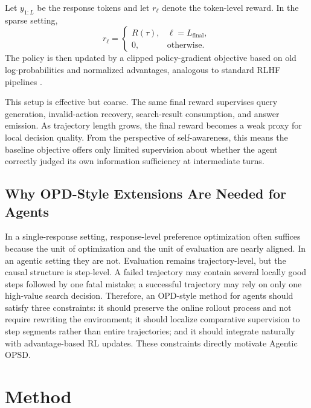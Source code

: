 \documentclass[11pt]{article}
\newcommand{\method}{Agentic OPSD}
\begin{document}
Let $y_{1:L}$ be the response tokens and let $r_{\ell}$ denote the token-level reward. In the sparse setting,
\begin{equation}
r_{\ell} =
\begin{cases}
R(\tau), & \ell = L_{\text{final}},\\
0, & \text{otherwise}.
\end{cases}
\end{equation}
The policy is then updated by a clipped policy-gradient objective based on old log-probabilities and normalized advantages, analogous to standard RLHF pipelines \citep{schulman2017ppo,deepseekr1}.

This setup is effective but coarse. The same final reward supervises query generation, invalid-action recovery, search-result consumption, and answer emission. As trajectory length grows, the final reward becomes a weak proxy for local decision quality. From the perspective of self-awareness, this means the baseline objective offers only limited supervision about whether the agent correctly judged its own information sufficiency at intermediate turns.

\subsection{Why OPD-Style Extensions Are Needed for Agents}
In a single-response setting, response-level preference optimization often suffices because the unit of optimization and the unit of evaluation are nearly aligned. In an agentic setting they are not. Evaluation remains trajectory-level, but the causal structure is step-level. A failed trajectory may contain several locally good steps followed by one fatal mistake; a successful trajectory may rely on only one high-value search decision. Therefore, an OPD-style method for agents should satisfy three constraints: it should preserve the online rollout process and not require rewriting the environment; it should localize comparative supervision to step segments rather than entire trajectories; and it should integrate naturally with advantage-based RL updates. These constraints directly motivate \method{}.

\section{Method}
\end{document}
